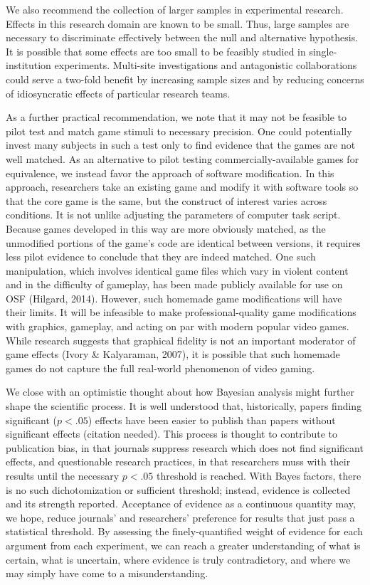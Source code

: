 \documentclass[fignum,nobf,man]{apa}
\begin{document}
We also recommend the collection of larger samples in experimental research. Effects in this research domain are known to be small. Thus, large samples are necessary to discriminate effectively between the null and alternative hypothesis. It is possible that some effects are too small to be feasibly studied in single-institution experiments. Multi-site investigations and antagonistic collaborations could serve a two-fold benefit by increasing sample sizes and by reducing concerns of idiosyncratic effects of particular research teams.

As a further practical recommendation, we note that it may not be feasible to pilot test and match game stimuli to necessary precision. One could potentially invest many subjects in such a test only to find evidence that the games are not well matched. As an alternative to pilot testing commercially-available games for equivalence, we instead favor the approach of software modification. In this approach, researchers take an existing game and modify it with software tools so that the core game is the same, but the construct of interest varies across conditions. It is not unlike adjusting the parameters of computer task script. Because games developed in this way are more obviously matched, as the unmodified portions of the game’s code are identical between versions, it requires less pilot evidence to conclude that they are indeed matched. One such manipulation, which involves identical game files which vary in violent content and in the difficulty of gameplay, has been made publicly available for use on OSF (Hilgard, 2014). However, such homemade game modifications will have their limits. It will be infeasible to make professional-quality game modifications with graphics, gameplay, and acting on par with modern popular video games. While research suggests that graphical fidelity is not an important moderator of game effects (Ivory \& Kalyaraman, 2007), it is possible that such homemade games do not capture the full real-world phenomenon of video gaming.

We close with an optimistic thought about how Bayesian analysis might further shape the scientific process. It is well understood that, historically, papers finding significant ($p < .05$) effects have been easier to publish than papers without significant effects (citation needed). This process is thought to contribute to publication bias, in that journals suppress research which does not find significant effects, and questionable research practices, in that researchers muss with their results until the necessary $p < .05$ threshold is reached. With Bayes factors, there is no such dichotomization or sufficient threshold; instead, evidence is collected and its strength reported. Acceptance of evidence as a continuous quantity may, we hope, reduce journals’ and researchers’ preference for results that just pass a statistical threshold. By assessing the finely-quantified weight of evidence for each argument from each experiment, we can reach a greater understanding of what is certain, what is uncertain, where evidence is truly contradictory, and where we may simply have come to a misunderstanding.
\end{document}
